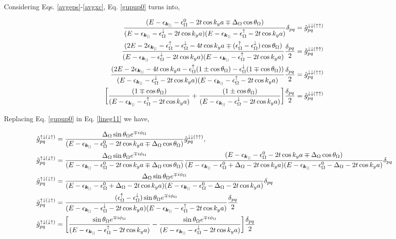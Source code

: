 \documentclass[10pt,prb,showpacs,amssymb,floatfix]{revtex4-1}
\newcommand{\dna}{\downarrow}
\newcommand{\nn}{\nonumber}
\newcommand{\upa}{\uparrow}
\newcommand{\up}{\uparrow}
\newcommand{\dlt}{\delta}
\newcommand{\Dlt}{\Delta}
\newcommand{\eps}{\epsilon}
\newcommand{\Og}{\Omega}
\begin{document}
Considering Eqs. \eqref{avgeps}-\eqref{avgxc}, Eq. \eqref{gupup0} turns into,


\begin{align}
\frac{(E-\eps_{\bm{k}_{||}}- \eps_\Og^0   -2t\cos k_ya  \mp \Dlt_\Og \cos\theta_\Og)}{(E-\eps_{\bm{k}_{||}}- \eps_\Og^\dna   -2t\cos k_ya)(E-\eps_{\bm{k}_{||}}- \eps_\Og^\upa   -2t\cos k_ya) }\dlt_{pq} &= \hat{g}^{\dna\dna (\upa\upa)}_{pq} \nn\\
\frac{(2E-2\eps_{\bm{k}_{||}} - \eps_\Og^\upa - \eps_\Og^\dna    -4t\cos k_ya   \mp (\eps_\Og^\upa - \eps_\Og^\dna ) \cos\theta_\Og)}{(E-\eps_{\bm{k}_{||}}- \eps_\Og^\dna   -2t\cos k_ya) (E-\eps_{\bm{k}_{||}}- \eps_\Og^\upa   -2t\cos k_ya)}\frac{\dlt_{pq}}{2} &= \hat{g}^{\dna\dna (\upa\upa)}_{pq} \nn\\
\frac{(2E-2\eps_{\bm{k}_{||}}   -4t\cos k_ya  -\eps_\Og^\upa (1\pm \cos\theta_\Og) - \eps_\Og^\dna( 1 \mp \cos\theta_\Og ) ) }{(E-\eps_{\bm{k}_{||}}- \eps_\Og^\dna   -2t\cos k_ya)(E-\eps_{\bm{k}_{||}}- \eps_\Og^\upa   -2t\cos k_ya) }\frac{\dlt_{pq}}{2} &= \hat{g}^{\dna\dna (\upa\upa )}_{pq} \nn\\
\bigg{[}   \frac{(1\mp\cos\theta_\Og)}{(E-\eps_{\bm{k}_{||}}- \eps_\Og^\upa   -2t\cos k_ya)}+ \frac{(1\pm\cos\theta_\Og)}{(E-\eps_{\bm{k}_{||}}- \eps_\Og^\dna   -2t\cos k_ya)} \bigg{]}\frac{\dlt_{pq}}{2}  &= \hat{g}^{\dna\dna (\upa\upa)}_{pq} 
\label{gupup2}
\end{align}

Replacing Eq. \eqref{gupup0}  in Eq. \eqref{lineg11} we have,


\begin{align}
\label{gupdnaall}
 \hat{g}^{\upa\dna(\dna\upa)}_{pq}  &= \frac{\Dlt_\Og \sin\theta_\Og e^{\mp i\phi_\Og}}{(E-\eps_{\bm{k}_{||}}- \eps_\Og^0   -2t\cos k_ya  \mp \Dlt_\Og \cos\theta_\Og)}  \hat{g}^{\dna\dna (\upa\upa)}_{pq}, \nn\\
 \hat{g}^{\upa\dna(\dna\upa)}_{pq}  &= \frac{\Dlt_\Og \sin\theta_\Og e^{\mp i\phi_\Og}}{(E-\eps_{\bm{k}_{||}}- \eps_\Og^0   -2t\cos k_ya  \mp \Dlt_\Og \cos\theta_\Og)}  \frac{(E-\eps_{\bm{k}_{||}}- \eps_\Og^0   -2t\cos k_ya  \mp \Dlt_\Og \cos\theta_\Og)}{(E-\eps_{\bm{k}_{||}}- \eps_\Og^0 +\Dlt_\Og  -2t\cos k_ya) (E-\eps_{\bm{k}_{||}}- \eps_\Og^0 -\Dlt_\Og  -2t\cos k_ya) } \dlt_{pq}  \nn\\
  \hat{g}^{\upa\dna(\dna\upa)}_{pq}  &= \frac{\Dlt_\Og \sin\theta_\Og e^{\mp i\phi_\Og}}{(E-\eps_{\bm{k}_{||}}- \eps_\Og^0 +\Dlt_\Og  -2t\cos k_ya) (E-\eps_{\bm{k}_{||}}- \eps_\Og^0 -\Dlt_\Og  -2t\cos k_ya) } \dlt_{pq} \nn\\
    \hat{g}^{\upa\dna(\dna\upa)}_{pq}  &= \frac{(\eps_\Og^\up - \eps_\Og^\dna) \sin\theta_\Og e^{\mp i\phi_\Og}}{(E-\eps_{\bm{k}_{||}} -\eps^\dna_\Og  -2t\cos k_ya) (E-\eps_{\bm{k}_{||}} -\eps_\Og^\upa  -2t\cos k_ya) } \frac{\dlt_{pq}}{2} \nn\\
\hat{g}^{\upa\dna(\dna\upa)}_{pq}  &= \bigg{[}\frac{ \sin\theta_\Og e^{\mp i\phi_\Og}}{ (E-\eps_{\bm{k}_{||}} -\eps_\Og^\upa  -2t\cos k_ya) } - \frac{ \sin\theta_\Og e^{\mp i\phi_\Og}}{(E-\eps_{\bm{k}_{||}} -\eps^\dna_\Og  -2t\cos k_ya)}\bigg{]} \frac{\dlt_{pq}}{2}
\end{align}
\end{document}

